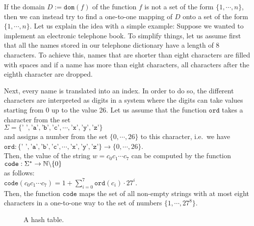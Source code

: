 If the domain $D := \mathtt{dom}(f)$ of the function $f$ is not a set of the form $\{1, \cdots, n\}$, 
then we can instead try to find a one-to-one mapping of $D$ onto a set of the form $\{1,\cdots,n\}$.
Let us explain the idea with a simple example:  Suppose we wanted to implement an electronic 
telephone book.
To simplify things, let us assume first that all the names stored in our telephone dictionary
have a length of 8 characters.  To achieve this, names that are shorter than eight characters
are filled with spaces and if a name has more than eight characters, all characters after the
eighth character are dropped.

Next, every name is translated into an index.  In order to do so, the different
characters are interpreted as digits in a system where the digits can take values starting
from 0 up to the value 26.
Let us assume that the function  $\mathtt{ord}$ takes a character from the set
\\[0.2cm]
\hspace*{1.3cm}
$\Sigma = \{ \texttt{' '}, \texttt{'a'}, \texttt{'b'}, \texttt{'c'}, \cdots, \texttt{'x'}, \texttt{'y'}, \texttt{'z'} \}$ 
\\[0.2cm]
and assigns a number from the set $\{0,\cdots,26\}$ to this character, i.e.~we have \\[0.2cm]
\hspace*{1.3cm} 
$\mathtt{ord}: \{ \texttt{' '}, \texttt{'a'}, \texttt{'b'}, \texttt{'c'}, \cdots, \texttt{'x'}, \texttt{'y'}, \texttt{'z'} \} \rightarrow \{0,\cdots, 26\}$.
\\[0.2cm]
Then, the value of the string  $w = c_0c_1\cdots c_7$ can be computed by the function \\[0.2cm]
\hspace*{1.3cm} 
$\mathtt{code}: \Sigma^* \rightarrow \mathbb{N} \symbol{92} \{ 0 \}$ \\[0.2cm]
as follows: \\[0.2cm]
\hspace*{1.3cm} 
$\mathtt{code}(c_0c_1\cdots c_7) = 1 + \sum\limits_{i=0}^7 \mathtt{ord}(c_i) \cdot 27^i$.
\\[0.2cm]
Then, the function $\mathtt{code}$ maps the set of all non-empty strings with at most eight characters in a
one-to-one way to the set of numbers $\{1,\cdots,27^8\}$.


\begin{figure}[!ht]
  \centering
  \caption{A hash table.}
  \label{fig:hash-example}
\end{figure}

